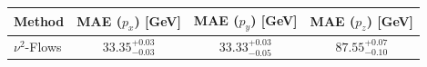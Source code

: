     \begin{tabular}{lccc}
        \toprule
        Method & MAE ($p_x$) [GeV] & MAE ($p_y$) [GeV] & MAE ($p_z$) [GeV] \\
        \midrule
        $\nu^2$-Flows & $33.35^{+0.03}_{-0.03}$ & $33.33^{+0.03}_{-0.05}$ & $87.55^{+0.07}_{-0.10}$ \\
        \bottomrule
    \end{tabular}